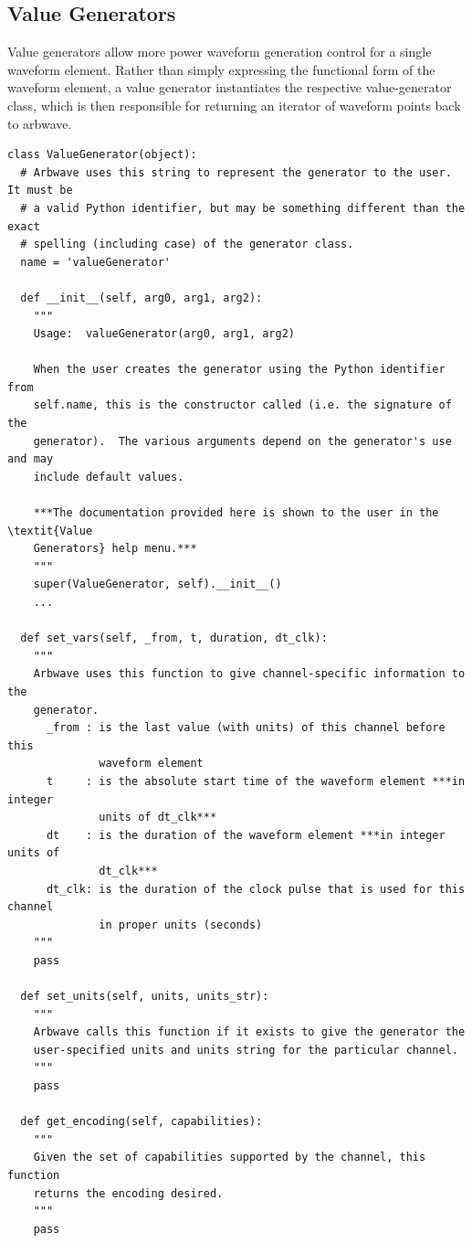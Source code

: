 \subsection{Value Generators}\label{sec:waveforms:generators}
Value generators allow more power waveform generation control for a single
waveform element.  Rather than simply expressing the functional form of the
waveform element, a value generator instantiates the respective value-generator
class, which is then responsible for returning an iterator of waveform points
back to arbwave.
%
\begin{lstlisting}
class ValueGenerator(object):
  # Arbwave uses this string to represent the generator to the user.  It must be
  # a valid Python identifier, but may be something different than the exact
  # spelling (including case) of the generator class.
  name = 'valueGenerator'

  def __init__(self, arg0, arg1, arg2):
    """
    Usage:  valueGenerator(arg0, arg1, arg2)

    When the user creates the generator using the Python identifier from
    self.name, this is the constructor called (i.e. the signature of the
    generator).  The various arguments depend on the generator's use and may
    include default values.

    ***The documentation provided here is shown to the user in the \textit{Value
    Generators} help menu.***
    """
    super(ValueGenerator, self).__init__()
    ...

  def set_vars(self, _from, t, duration, dt_clk):
    """
    Arbwave uses this function to give channel-specific information to the
    generator.
      _from : is the last value (with units) of this channel before this
              waveform element
      t     : is the absolute start time of the waveform element ***in integer
              units of dt_clk***
      dt    : is the duration of the waveform element ***in integer units of
              dt_clk***
      dt_clk: is the duration of the clock pulse that is used for this channel
              in proper units (seconds)
    """
    pass

  def set_units(self, units, units_str):
    """
    Arbwave calls this function if it exists to give the generator the
    user-specified units and units string for the particular channel.
    """
    pass

  def get_encoding(self, capabilities):
    """
    Given the set of capabilities supported by the channel, this function
    returns the encoding desired.
    """
    pass


\end{lstlisting}
